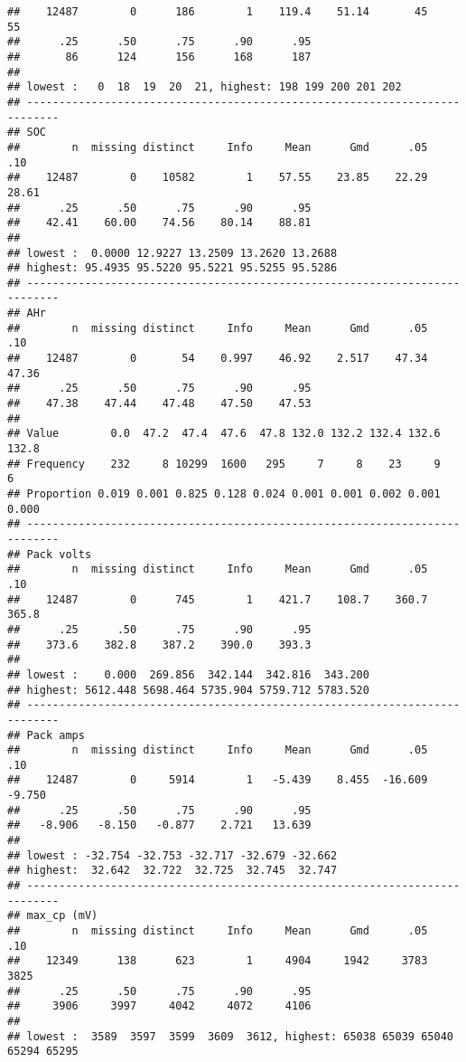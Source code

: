 \documentclass[]{article}
\begin{document}
\begin{verbatim}
##    12487        0      186        1    119.4    51.14       45       55 
##      .25      .50      .75      .90      .95 
##       86      124      156      168      187 
## 
## lowest :   0  18  19  20  21, highest: 198 199 200 201 202
## ---------------------------------------------------------------------------
## SOC 
##        n  missing distinct     Info     Mean      Gmd      .05      .10 
##    12487        0    10582        1    57.55    23.85    22.29    28.61 
##      .25      .50      .75      .90      .95 
##    42.41    60.00    74.56    80.14    88.81 
## 
## lowest :  0.0000 12.9227 13.2509 13.2620 13.2688
## highest: 95.4935 95.5220 95.5221 95.5255 95.5286
## ---------------------------------------------------------------------------
## AHr 
##        n  missing distinct     Info     Mean      Gmd      .05      .10 
##    12487        0       54    0.997    46.92    2.517    47.34    47.36 
##      .25      .50      .75      .90      .95 
##    47.38    47.44    47.48    47.50    47.53 
##                                                                       
## Value        0.0  47.2  47.4  47.6  47.8 132.0 132.2 132.4 132.6 132.8
## Frequency    232     8 10299  1600   295     7     8    23     9     6
## Proportion 0.019 0.001 0.825 0.128 0.024 0.001 0.001 0.002 0.001 0.000
## ---------------------------------------------------------------------------
## Pack volts 
##        n  missing distinct     Info     Mean      Gmd      .05      .10 
##    12487        0      745        1    421.7    108.7    360.7    365.8 
##      .25      .50      .75      .90      .95 
##    373.6    382.8    387.2    390.0    393.3 
## 
## lowest :    0.000  269.856  342.144  342.816  343.200
## highest: 5612.448 5698.464 5735.904 5759.712 5783.520
## ---------------------------------------------------------------------------
## Pack amps 
##        n  missing distinct     Info     Mean      Gmd      .05      .10 
##    12487        0     5914        1   -5.439    8.455  -16.609   -9.750 
##      .25      .50      .75      .90      .95 
##   -8.906   -8.150   -0.877    2.721   13.639 
## 
## lowest : -32.754 -32.753 -32.717 -32.679 -32.662
## highest:  32.642  32.722  32.725  32.745  32.747
## ---------------------------------------------------------------------------
## max_cp (mV) 
##        n  missing distinct     Info     Mean      Gmd      .05      .10 
##    12349      138      623        1     4904     1942     3783     3825 
##      .25      .50      .75      .90      .95 
##     3906     3997     4042     4072     4106 
## 
## lowest :  3589  3597  3599  3609  3612, highest: 65038 65039 65040 65294 65295

\end{verbatim}
\end{document}
